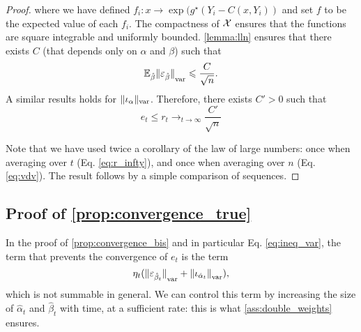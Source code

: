 \begin{proof}
where we have defined $f_i: x \to \exp(g^\star(Y_i - C(x, Y_i))$ and set $f$ to be the
expected value of each $f_i$. The compactness of $\mathcal{X}$ ensures that the
functions  are square integrable and uniformly bounded. \autoref{lemma:lln} ensures that there exists $C$ (that depends only on $\alpha$ and $\beta$) such that
\begin{equation}\label{eq:vdv}
    \mathbb{E}_{\hat \beta} {\Vert \varepsilon_{\hat \beta} \Vert}_{\text{\upshape var}}  \leqslant \frac{C}{\sqrt{n}}.
\end{equation}
A similar results holds for $\Vert \iota_\alpha \Vert_{\text{\upshape var}}$. Therefore, there exists $C' > 0$ such that
\begin{equation}
    e_t \leq r_t \to_{t\to \infty} \frac{C'}{\sqrt{n}}
\end{equation}

Note that we have used twice a corollary of the law of large numbers: once when averaging over $t$ (Eq. \eqref{eq:r_infty}), and once when averaging over $n$ (Eq. \eqref{eq:vdv}).
The result follows by a simple comparison of sequences.
\end{proof}

\subsection{Proof of \autoref{prop:convergence_true}}\label{sec:proof_prop_convergence}

In the proof of \autoref{prop:convergence_bis} and in particular Eq. \eqref{eq:ineq_var}, the term that prevents the convergence of $e_t$ is the term
\begin{equation}
    \eta_t ({\Vert \varepsilon_{\hat \beta_t} \Vert}_{\text{\upshape var}} + 
    {\Vert \iota_{\hat \alpha_t} \Vert}_{\text{\upshape var}}),
\end{equation}
which is not summable in general. We can control this term by increasing the
 size of $\hat \alpha_t$ and $\hat \beta_t$ with time, at a sufficient rate: this is what \autoref{ass:double_weights} ensures.

